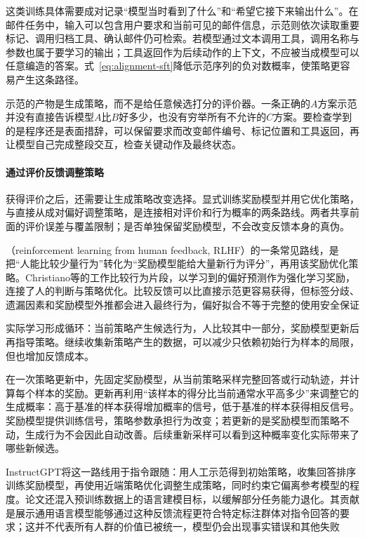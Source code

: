 这类训练具体需要成对记录“模型当时看到了什么”和“希望它接下来输出什么”。在邮件任务中，输入可以包含用户要求和当前可见的邮件信息，示范则依次读取重要标记、调用归档工具、确认邮件仍可检索。若模型通过文本调用工具，调用名称与参数也属于要学习的输出；工具返回作为后续动作的上下文，不应被当成模型可以任意编造的答案。式~\eqref{eq:alignment-sft}降低示范序列的负对数概率，使策略更容易产生这条路径。

示范的产物是生成策略，而不是给任意候选打分的评价器。一条正确的$A$方案示范并没有直接告诉模型$A$比$B$好多少，也没有穷举所有不允许的$C$方案。要检查学到的是程序还是表面措辞，可以保留要求而改变邮件编号、标记位置和工具返回，再让模型自己完成整段交互，检查关键动作及最终状态。

\paragraph{通过评价反馈调整策略}

获得评价之后，还需要让生成策略改变选择。显式训练奖励模型并用它优化策略，与直接从成对偏好调整策略，是连接相对评价和行为概率的两条路线。两者共享前面的评价误差与覆盖限制；是否单独保留奖励模型，不会改变反馈本身的真伪。

（reinforcement learning from human feedback, RLHF）的一条常见路线，是把“人能比较少量行为”转化为“奖励模型能给大量新行为评分”，再用该奖励优化策略。Christiano等的工作比较行为片段，以学习到的偏好预测作为强化学习奖励，连接了人的判断与策略优化。比较反馈可以比直接示范更容易获得，但标签分歧、遗漏因素和奖励模型外推都会进入最终行为，偏好拟合不等于完整的使用安全保证

实际学习形成循环：当前策略产生候选行为，人比较其中一部分，奖励模型更新后再指导策略。继续收集新策略产生的数据，可以减少只依赖初始行为样本的局限，但也增加反馈成本。

在一次策略更新中，先固定奖励模型，从当前策略采样完整回答或行动轨迹，并计算每个样本的奖励。更新再利用“该样本的得分比当前通常水平高多少”来调整它的生成概率：高于基准的样本获得增加概率的信号，低于基准的样本获得相反信号。奖励模型提供训练信号，策略参数承担行为改变；若更新的是奖励模型而策略不动，生成行为不会因此自动改善。后续重新采样可以看到这种概率变化实际带来了哪些新候选。

InstructGPT将这一路线用于指令跟随：用人工示范得到初始策略，收集回答排序训练奖励模型，再使用近端策略优化调整生成策略，同时约束它偏离参考模型的程度。论文还混入预训练数据上的语言建模目标，以缓解部分任务能力退化。其贡献是展示通用语言模型能够通过这种反馈流程更符合特定标注群体对指令回答的要求；这并不代表所有人群的价值已被统一，模型仍会出现事实错误和其他失败

